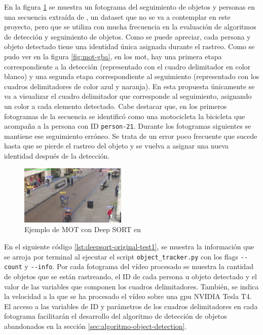 En la figura \ref{fig:prueba-deepsort-frame53} se muestra un fotograma del seguimiento de objetos y personas en una secuencia extraída de \cite{Benfold2011StableMT}, un dataset que no se va a contemplar en este proyecto, pero que se utiliza con mucha frecuencia en la evaluación de algoritmos de detección y seguimiento de objetos. Como se puede apreciar, cada persona y objeto detectado tiene una identidad única asignada durante el rastreo. Como se pudo ver en la figura \ref{fig:mot-gba}, en los \gls{mot}, hay una primera etapa correspondiente a la detección (representado con el cuadro delimitador en color blanco) y una segunda etapa correspondiente al seguimiento (representado con los cuadros delimitadores de color azul y naranja). En esta propuesta únicamente se va a visualizar el cuadro delimitador que corresponde al seguimiento, asignando un color a cada elemento detectado. Cabe destacar que, en los primeros fotogramas de la secuencia se identificó como una motocicleta la bicicleta que acompaña a la persona con ID \texttt{person-21}. Durante los fotogramas siguientes se mantiene ese seguimiento erróneo. Se trata de un error poco frecuente que sucede hasta que se pierde el rastreo del objeto y se vuelva a asignar una nueva identidad después de la detección.

\begin{figure}[ht]
\centering
\includegraphics[width=0.45\textwidth]{img/chapters/desarrollo/prueba-deepsort-frame53.jpg}
\caption{\label{fig:prueba-deepsort-frame53}Ejemplo de MOT con Deep SORT en \cite{Benfold2011StableMT}}
\end{figure}

En el siguiente código \ref{lst:deepsort-original-test1}, se muestra la información que se arroja por terminal al ejecutar el script \texttt{object\_tracker.py} con los flags \texttt{-{}-count} y \texttt{-{}-info}. Por cada fotograma del vídeo procesado se muestra la cantidad de objetos que se están rastreando, el ID de cada persona u objeto detectado y el valor de las variables que componen los cuadros delimitadores. También, se indica la velocidad a la que se ha procesado el vídeo sobre una \gls{gpu} NVIDIA Tesla T4. El acceso a las variables de ID y parámetros de los cuadros delimitadores en cada fotograma facilitarán el desarrollo del algoritmo de detección de objetos abandonados en la sección \ref{sec:algoritmo-object-detection}.

